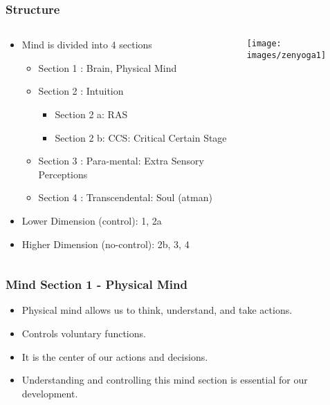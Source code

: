 \begin{frame}[fragile]
\frametitle{Structure}

\begin{columns}[T] %
\begin{column}{.48\textwidth}
\begin{itemize}
\item Mind is divided into 4 sections
	\begin{itemize}
	\item Section 1 : Brain, Physical Mind
	\item Section 2 : Intuition
	\begin{itemize}
		\item Section 2 a: RAS
		\item Section 2 b: CCS: Critical Certain Stage
	\end{itemize}
	\item Section 3 : Para-mental: Extra Sensory Perceptions
	\item Section 4 : Transcendental: Soul (atman)
	\end{itemize}
\item Lower Dimension (control): 1, 2a
\item Higher Dimension (no-control): 2b, 3, 4
\end{itemize}
\end{column}%
\hfill%
\begin{column}{.48\textwidth}
 \begin{center}
\texttt{[image: images/zenyoga1]}
\end{center}

\end{column}%
\end{columns}
\end{frame}

\begin{frame}[fragile]\frametitle{Mind Section 1 - Physical Mind}
\begin{itemize}
    \item Physical mind allows us to think, understand, and take actions.
    \item Controls voluntary functions.
    \item It is the center of our actions and decisions.
    \item Understanding and controlling this mind section is essential for our development.
\end{itemize}
\end{frame}

